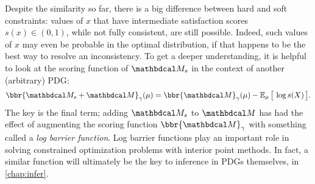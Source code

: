 Despite the similarity so far, there is a big difference between hard and soft constraints:
    values of $x$ that have intermediate satisfaction scores $s(x) \in (0,1)$,
    while not fully consistent, are still possible.
Indeed, such values of $x$ may even be probable 
in the optimal distribution, 
    if that happens to be the best way to resolve an inconsistency.
To get a deeper understanding, it is helpful to look at the scoring function of 
$\dg M_s$ in the context of another (arbitrary) PDG:
\begin{equation}
    \bbr{\dg M_s + \dg M}_\gamma(\mu) 
        = \bbr{\dg M}_\gamma(\mu) - \Ex\nolimits_\mu \big[\, \log s(X) \,\big].
        \label{eq:soft-constr-score}
\end{equation}
The key is the final term;
    adding $\dg M_s$ to $\dg M$ has had the effect of
    augmenting the scoring function $\bbr{\dg M}_\gamma$ with 
    something called a \emph{log barrier function}.
%
Log barrier functions play an important role in solving constrained optimization problems with interior point methods. In fact, a similar function will ultimately be the key to inference in PDGs themselves, in \cref{chap:infer}.




